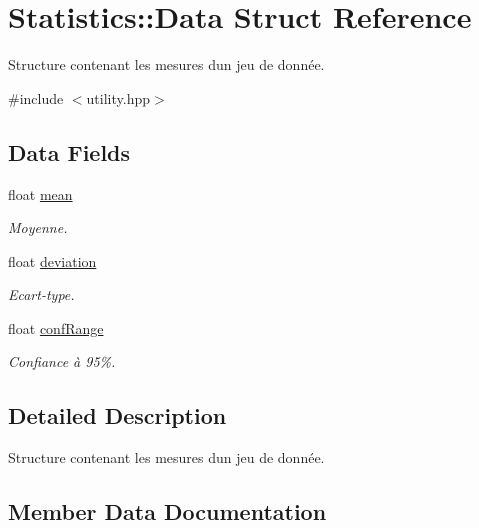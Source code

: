 \hypertarget{structStatistics_1_1Data}{}\section{Statistics\+:\+:Data Struct Reference}
\label{structStatistics_1_1Data}


Structure contenant les mesures d\textquotesingle{}un jeu de donnée.  




{\ttfamily \#include $<$utility.\+hpp$>$}

\subsection*{Data Fields}
\begin{DoxyCompactItemize}
\item 
float \hyperlink{structStatistics_1_1Data_a70c674f35bce1803c894c1df2649ac3f}{mean}
\begin{DoxyCompactList}\small\item\em Moyenne. \end{DoxyCompactList}\item 
float \hyperlink{structStatistics_1_1Data_a4ab98072b8f7055a828ea80077a059f0}{deviation}
\begin{DoxyCompactList}\small\item\em Ecart-\/type. \end{DoxyCompactList}\item 
float \hyperlink{structStatistics_1_1Data_a098a51c15f9d1c2b0d50fd89fc956c06}{conf\+Range}
\begin{DoxyCompactList}\small\item\em Confiance à 95\%. \end{DoxyCompactList}\end{DoxyCompactItemize}


\subsection{Detailed Description}
Structure contenant les mesures d\textquotesingle{}un jeu de donnée. 

\subsection{Member Data Documentation}
\mbox{\label{structStatistics_1_1Data_a098a51c15f9d1c2b0d50fd89fc956c06}} 
